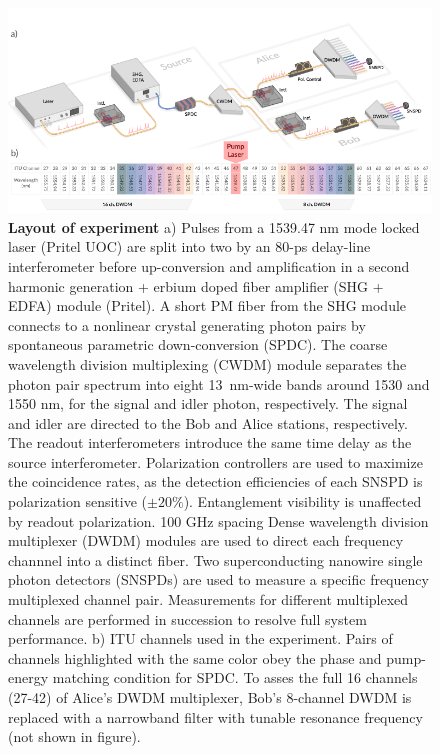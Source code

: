 \documentclass[11pt]{caltech_thesis} %
\begin{document}
\hypertarget{fig:system}{%
\begin{figure}
\centering
\includegraphics[width=1\textwidth,height=\textheight]{./chapter_05/figs/sys_drawing_light.pdf}
\caption[{Layout of experiment}]{\textbf{Layout of experiment} a) Pulses from a 1539.47 nm mode locked laser (Pritel UOC) are split into two by an 80-ps delay-line interferometer before up-conversion and amplification in a second harmonic generation + erbium doped fiber amplifier (SHG + EDFA) module (Pritel). A short PM fiber from the SHG module connects to a nonlinear crystal generating photon pairs by spontaneous parametric down-conversion (SPDC). The coarse wavelength division multiplexing (CWDM) module separates the photon pair spectrum into eight 13~nm-wide bands around 1530 and 1550 nm, for the signal and idler photon, respectively. The signal and idler are directed to the Bob and Alice stations, respectively. The readout interferometers introduce the same time delay as the source interferometer. Polarization controllers are used to maximize the coincidence rates, as the detection efficiencies of each SNSPD is polarization sensitive ($\pm20\%$). Entanglement visibility is unaffected by readout polarization. 100 GHz spacing Dense wavelength division multiplexer (DWDM) modules are used to direct each frequency channnel into a distinct fiber. Two superconducting nanowire single photon detectors (SNSPDs) are used to measure a specific frequency multiplexed channel pair. Measurements for different multiplexed channels are performed in succession to resolve full system performance. b) ITU channels used in the experiment. Pairs of channels highlighted with the same color obey the phase and pump-energy matching condition for SPDC. To asses the full 16 channels (27-42) of Alice's DWDM multiplexer, Bob's 8-channel DWDM is replaced with a narrowband filter with tunable resonance frequency (not shown in figure).}
\label{fig:system}
\end{figure}
}
\end{document}
